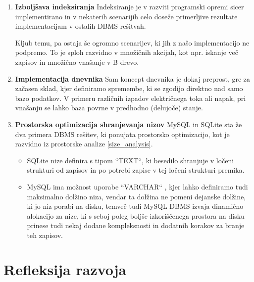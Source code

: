\documentclass[a4paper,12pt,openright]{book}
\begin{document}
    \begin{enumerate}
        \item \textbf{Izboljšava indeksiranja}
        \newline
        \noindent
        Indeksiranje je v razviti programski opremi sicer implementirano in v nekaterih scenarijih celo doseže primerljive rezultate implementacijam v ostalih DBMS rešitvah.

        Kljub temu, pa ostaja še ogromno scenarijev, ki jih z našo implementacijo ne podpremo. To je sploh razvidno v množičnih akcijah, kot npr. iskanje več zapisov in množično vnašanje v B drevo.

        \item \textbf{Implementacija dnevnika}
        \newline
        \noindent
        Sam koncept dnevnika je dokaj preprost, gre za začasen sklad, kjer definiramo spremembe, ki se zgodijo direktno nad samo bazo podatkov. V primeru različnih izpadov električnega toka ali napak, pri vnašanju se lahko baza povrne v predhodno (delujoče) stanje.

        \item \textbf{Prostorska optimizacija shranjevanja nizov}
        \newline
        \noindent
        MySQL in SQLite sta že dva primera DBMS rešitev, ki ponujata prostorsko optimizacijo, kot je razvidno iz prostorske analize \ref{size_analysis}.
        \begin{itemize}
            \item SQLite nize definira s tipom ``TEXT``, ki besedilo shranjuje v ločeni strukturi od zapisov in po potrebi zapise v tej ločeni strukturi premika.
            \item MySQL ima možnost uporabe ``VARCHAR`` \cite{MYSQL_VARCHAR}, kjer lahko definiramo tudi maksimalno dolžino niza, vendar ta dolžina ne pomeni dejanske dolžine, ki jo niz porabi na disku, temveč tudi MySQL DBMS izvaja dinamično alokacijo za nize, ki s seboj poleg boljše izkoriščenega prostora na disku prinese tudi nekaj dodane kompleksnosti in dodatnih korakov za branje teh zapisov.
        \end{itemize}
    \end{enumerate}
    
    \section{Refleksija razvoja}
    \label{refleksija}
\end{document}
